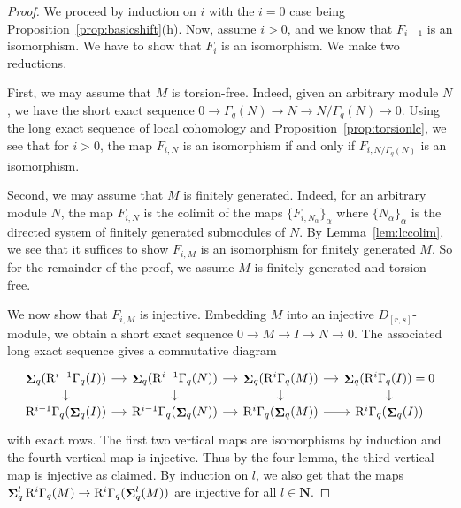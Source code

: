 \documentclass[12pt]{amsart}
\newcommand{\bN}{\mathbf{N}}
\newcommand{\rR}{\mathrm{R}}
\DeclareMathOperator{\Sh}{\bf{\Sigma}}
\newcommand{\Drs}{D_{[r,s]}}
\newcommand{\mShq}{\Sh_{q}}
\newcommand{\mGaq}{\Gamma_{q}}
\numberwithin{equation}{section}
\theoremstyle{definition}
\theoremstyle{plain}
\begin{document}
\begin{proof}
  We proceed by induction on $i$ with the $i=0$ case being Proposition~\ref{prop:basicshift}(h). Now, assume $i > 0$, and we know that $F_{i-1}$ is an isomorphism. We have to show that $F_i$ is an isomorphism. We make two reductions. 
 
 First, we may assume that $M$ is torsion-free. Indeed, given an arbitrary module $N$, we have the short exact sequence $0 \to \mGaq(N) \to N \to N/\mGaq(N) \to 0$. Using the long exact sequence of local cohomology and Proposition~\ref{prop:torsionlc}, we see that for $i > 0$, the map $F_{i, N}$ is an isomorphism if and only if $F_{i, N/\mGaq(N)}$ is an isomorphism. 
 
 Second, we may assume that $M$ is finitely generated. Indeed, for an arbitrary module $N$, the map $F_{i, N}$ is the colimit of the maps $\{F_{i, N_{\alpha}}\}_{\alpha}$ where $\{N_\alpha\}_{\alpha}$ is the directed system of finitely generated submodules of $N$. By Lemma~\ref{lem:lccolim}, we see that it suffices to show  $F_{i, M}$ is an isomorphism for finitely generated $M$. So for the remainder of the proof, we assume $M$ is finitely generated and torsion-free.
 
 We now show that $F_{i,M}$ is injective. Embedding $M$ into an injective $\Drs$-module, we obtain a short exact sequence $ 0 \to M \to I \to N \to 0.$ 
 The associated long exact sequence gives a commutative diagram
 \[
  \begin{tikzcd}[sep=small]
     \mShq(\rR^{i-1}\mGaq(I)) \arrow[d] \arrow[r] & \mShq(\rR^{i-1}\mGaq(N)) \arrow[d] \arrow[r] & \mShq(\rR^i \mGaq(M)) \arrow[d] \arrow[r] & \mShq(\rR^i\mGaq(I)) = 0 \arrow[d] \\
    \rR^{i-1}\mGaq(\mShq(I)) \arrow[r] &  \rR^{i-1}\mGaq(\mShq(N)) \arrow[r] & \rR^{i}\mGaq(\mShq(M)) \arrow[r] & \rR^i\mGaq(\mShq(I)) 
  \end{tikzcd}
 \]
with exact rows. The first two vertical maps are isomorphisms by induction and the fourth vertical map is injective. Thus by the four lemma, the third vertical map is injective as claimed. By induction on $l$, we also get that the maps $\mShq^l\rR^i\mGaq(M) \to \rR^i\mGaq(\mShq^l(M))$ are injective for all $l \in \bN$.


\end{proof}
\end{document}
